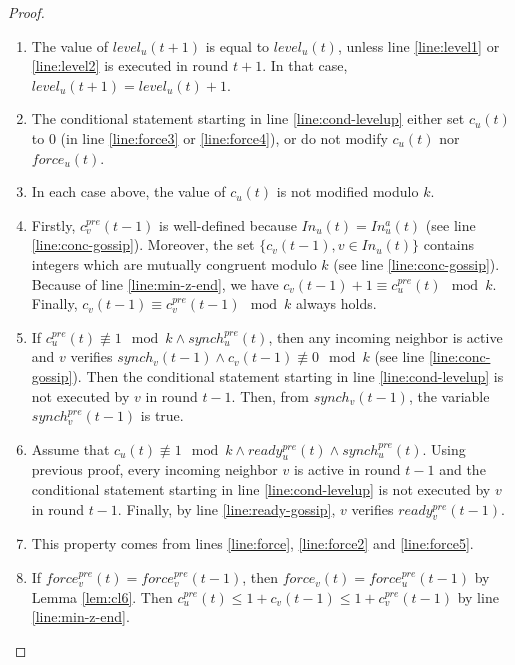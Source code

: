 \documentclass[11pt,letterpaper]{article}
\begin{document}
\begin{proof} \hfill
	\begin{enumerate}[label=\upshape(\alph*),ref=\thethm (\alph*)]
		\item The value of $level_u(t+1)$ is equal to $level_u(t)$, unless line \ref{line:level1} or \ref{line:level2} is executed in round $t+1$.
			In that case, $level_u(t+1) = level_u(t)+1$.
		\item The conditional statement starting in line \ref{line:cond-levelup} either set $c_u(t)$ to 0 (in line \ref{line:force3} or \ref{line:force4}),
			or do not modify $c_u(t)$ nor $force_u(t)$.
		\item In each case above, the value of $c_u(t)$ is not modified modulo $k$.
		\item Firstly, $c_v^{pre}(t-1)$ is well-defined because $In_u(t) = In_u^a(t)$ (see line \ref{line:conc-gossip}). 
			Moreover, the set $\{c_v(t-1), v \in In_u(t)\}$ contains integers which are mutually congruent modulo $k$ (see line \ref{line:conc-gossip}).
			Because of line \ref{line:min-z-end}, we have $c_v(t-1) + 1 \equiv c_u^{pre}(t) \mod k$.
			Finally, $c_v(t-1) \equiv c_v^{pre}(t-1) \mod k$ always holds.
		\item If $c_u^{pre}(t) \not\equiv 1 \mod k \wedge synch_u^{pre}(t)$, then any incoming neighbor is active
			and $v$ verifies $synch_v(t-1) \wedge c_v(t-1) \not\equiv 0 \mod k$ (see line \ref{line:conc-gossip}).
			Then the conditional statement starting in line \ref{line:cond-levelup} is not executed by $v$ in round $t-1$.
			Then, from $synch_v(t-1)$, the variable $synch_v^{pre}(t-1)$ is true.
		\item Assume that $c_u(t) \not\equiv 1 \mod k \wedge ready_u^{pre}(t) \wedge synch_u^{pre}(t)$.
			Using previous proof, every incoming neighbor $v$ is active in round $t-1$ and
			the conditional statement starting in line \ref{line:cond-levelup} is not executed by $v$ in round $t-1$.
			Finally, by line \ref{line:ready-gossip}, $v$ verifies $ready_v^{pre}(t-1)$.
		\item This property comes from lines \ref{line:force}, \ref{line:force2} and \ref{line:force5}.
		\item If $force_v^{pre}(t) = force_v^{pre}(t-1)$, then $force_v(t) = force_u^{pre}(t-1)$ by Lemma \ref{lem:cl6}.
			Then $c_u^{pre}(t) \leq 1+c_v(t-1) \leq 1+c_v^{pre}(t-1)$ by line \ref{line:min-z-end}.
	\end{enumerate}
\end{proof}
\end{document}
